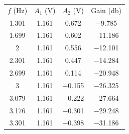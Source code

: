 \begin{center}
\begin{tabular}{cccc}
$f$ (\unit{\hertz}) & $A_1$ (\unit{\volt}) & $A_2$ (\unit{\volt}) & Gain (\unit{\decibel}) \\ 
\num{1.301} & \num{1.161} & \num{0.672} & \num{-9.785}\\ 
\num{1.699} & \num{1.161} & \num{0.602} & \num{-11.186}\\ 
\num{2} & \num{1.161} & \num{0.556} & \num{-12.101}\\ 
\num{2.301} & \num{1.161} & \num{0.447} & \num{-14.284}\\ 
\num{2.699} & \num{1.161} & \num{0.114} & \num{-20.948}\\ 
\num{3} & \num{1.161} & \num{-0.155} & \num{-26.325}\\ 
\num{3.079} & \num{1.161} & \num{-0.222} & \num{-27.664}\\ 
\num{3.176} & \num{1.161} & \num{-0.301} & \num{-29.248}\\ 
\num{3.301} & \num{1.161} & \num{-0.398} & \num{-31.186}\\ 
\end{tabular}
\end{center}
